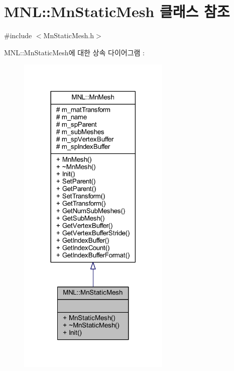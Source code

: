 \hypertarget{class_m_n_l_1_1_mn_static_mesh}{}\section{M\+NL\+:\+:Mn\+Static\+Mesh 클래스 참조}
\label{class_m_n_l_1_1_mn_static_mesh}


{\ttfamily \#include $<$Mn\+Static\+Mesh.\+h$>$}



M\+NL\+:\+:Mn\+Static\+Mesh에 대한 상속 다이어그램 \+: \nopagebreak
\begin{figure}[H]
\begin{center}
\leavevmode
\includegraphics[width=206pt]{class_m_n_l_1_1_mn_static_mesh__inherit__graph}
\end{center}
\end{figure}


